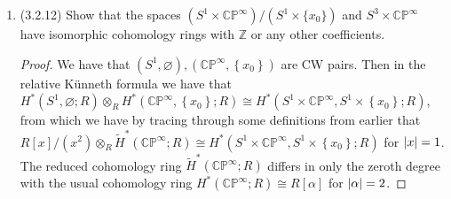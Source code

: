 \documentclass[11pt]{article}
\newcommand{\cbr}[1]{\left\{#1\right\}}
\DeclareMathOperator{\Hom}{Hom}
\begin{document}
\begin{enumerate}
\begin{proof}
        A map $f\colon S^{k+\ell}\to S^k\times S^l$ induces a ring homomorphism $f^\ast\colon H^\ast(S^k\times S^l)\to H^\ast(S^{k+\ell})$. By the K\"unneth formula (cross product) we have an isomorphism $H^\ast(S^k)\otimes H^\ast(S^\ell)\cong H^\ast(S^k\times S^l)$. We have the isomorphisms $H^\ast(S^k)\cong \mathbb{Z}[\alpha]/(\alpha^2)$ and $H^\ast(S^\ell)\cong \mathbb{Z}[\beta]/(\beta^2)$ for $\abs{\alpha}=k,\abs{\beta}=\ell$. As groups, both cohomology rings are the integers since the only nonzero cohomology group of the sphere is in the degree of the dimension of the sphere -- so as groups we have $H^\ast(S^k)\cong \mathbb{Z}$ and $H^\ast(S^\ell)\cong \mathbb{Z}$ so that the tensor product of modules $H^\ast(S^k)\otimes H^\ast(S^\ell)\cong H^\ast(S^k\times S^l)$ becomes $H^\ast(S^k)\otimes H^\ast(S^\ell)\cong \mathbb{Z}\otimes \mathbb{Z}\cong \mathbb{Z} \cong H^\ast(S^k\times S^l)$.
        
        With $p_1,p_2$ the projections of $S^k\times S^\ell$ onto the first and second components we have by the K\"unneth formula again that the generator of $H^\ast(S^k\times S^l)$ is the image of $\alpha\otimes \beta = p_1^\ast\alpha\cup p_2^\ast\beta$, in degree $k+\ell$. But then the action of $f^\ast$ on this generator is trivial since $H^\ast(S^{k+\ell})$ is trivial in degrees $k$ and $\ell$: $f^\ast(p_1^\ast\alpha\cup p_2^\ast\beta) = f^\ast p_1^\ast\alpha\cup f^\ast p_2^\ast\beta= 0\cup 0 = 0$. It follows that $f^\ast \colon H^{k+\ell}(S^k\times S^\ell)\to H^{k+\ell}(S^{k+\ell})$ is the trivial map.

        By the naturality of the universal coefficient theorem we have that $(f_\ast)^\ast\colon \Hom(H_{k+\ell}(S^k\times S^\ell),\mathbb{Z})\to \Hom(H_{k+\ell}(S^{k+\ell}),\mathbb{Z})$ is trivial also. Thus $f_\ast\colon H_{k+\ell}(S^{k+\ell})\to H_{k+\ell}(S^k\times S^\ell)$ is trivial as needed.
    \end{proof}
    \item (3.2.12) Show that the spaces $(S^1\times \mathbb{CP}^\infty)/(S^1\times \{x_0\})$ and $S^3\times \mathbb{CP}^\infty$ have isomorphic cohomology rings with $\mathbb{Z}$ or any other coefficients. \begin{proof}
        We have that $(S^1,\varnothing),(\mathbb{CP}^\infty,\cbr{x_0})$ are CW pairs. Then in the relative K\"unneth formula we have that $H^\ast(S^1,\varnothing;R)\otimes_R H^\ast(\mathbb{CP}^\infty,\cbr{x_0};R)\cong H^\ast(S^1\times \mathbb{CP^\infty},S^1\times\cbr{x_0};R)$, from which we have by tracing through some definitions from earlier that $R[x]/(x^2)\otimes_R \tilde H^\ast(\mathbb{CP}^\infty;R)\cong H^\ast(S^1\times \mathbb{CP^\infty},S^1\times\cbr{x_0};R)$ for $\abs{x} = 1$. The reduced cohomology ring $\tilde H^\ast(\mathbb{CP}^\infty;R)$ differs in only the zeroth degree with the usual cohomology ring $H^\ast(\mathbb{CP}^\infty;R)\cong R[\alpha]$ for $\abs{\alpha} = 2$. 


\end{proof}
\end{enumerate}
\end{document}
